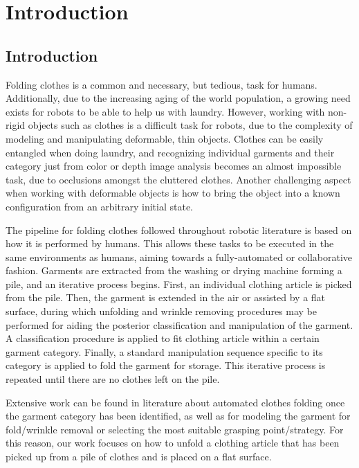 \chapter{Introduction}
\label{introduction}

\section{Introduction}
\label{intro_introduction}
Folding clothes is a common and necessary, but tedious, task for humans. Additionally, due to the increasing aging of the world population, a growing need exists for robots to be able to help us with laundry.
However, working with non-rigid objects such as clothes is a difficult task for robots, due to the complexity of modeling and manipulating deformable, thin objects. Clothes can be easily entangled when doing laundry, and recognizing individual garments and their category just from color or depth image analysis becomes an almost impossible task, due to occlusions amongst the cluttered clothes. Another challenging aspect when working with deformable objects is how to bring the object into a known configuration from an arbitrary initial state.

The pipeline for folding clothes followed throughout robotic literature is based on how it is performed by humans. This allows these tasks to be executed in the same environments as humans, aiming towards a fully-automated or collaborative fashion. Garments are extracted from the washing or drying machine forming a pile, and an iterative process begins. First, an individual clothing article is picked from the pile. Then, the garment is extended in the air or assisted by a flat surface, during which unfolding and wrinkle removing procedures may be performed for aiding the posterior classification and manipulation of the garment. A classification procedure is applied to fit clothing article within a certain garment category. Finally, a standard manipulation sequence specific to its category is applied to fold the garment for storage. This iterative process is repeated until there are no clothes left on the pile.

Extensive work can be found in literature about automated clothes folding once the garment category has been identified, as well as for modeling the garment for fold/wrinkle removal or selecting the most suitable grasping point/strategy. For this reason, our work focuses on how to unfold a clothing article that has been picked up from a pile of clothes and is placed on a flat surface.

